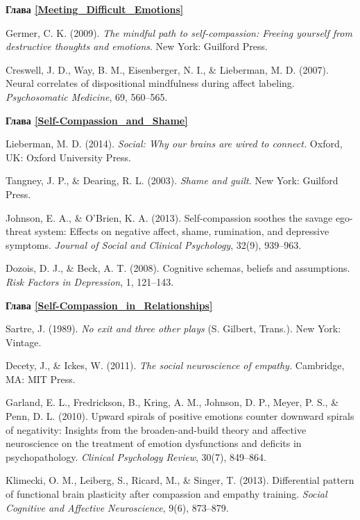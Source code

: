 \begin{thebibliography}{999}
	
	\vspace{3ex}
	\textbf{Глава \ref{Meeting_Difficult_Emotions}}
	
	 Germer, C. K. (2009). \textit{The mindful path to self-compassion: Freeing yourself from destructive thoughts and emotions}. New York: Guilford Press.
	
	 Creswell, J. D., Way, B. M., Eisenberger, N. I., \& Lieberman, M. D. (2007). Neural correlates of dispositional mindfulness during affect labeling. \textit{Psychosomatic Medicine}, 69, 560–565.
	
	
	\vspace{3ex}
	\textbf{Глава \ref{Self-Compassion_and_Shame}}
	
	 Lieberman, M. D. (2014). \textit{Social: Why our brains are wired to connect.} Oxford, UK: Oxford University Press.
	
	 Tangney, J. P., \& Dearing, R. L. (2003). \textit{Shame and guilt}. New York: Guilford Press.
	
	 Johnson, E. A., \& O’Brien, K. A. (2013). Self-compassion soothes the savage ego-threat system: Effects on negative affect, shame, rumination, and depressive symptoms. \textit{Journal of Social and Clinical Psychology}, 32(9), 939–963.
	
	 Dozois, D. J., \& Beck, A. T. (2008). Cognitive schemas, beliefs and assumptions. \textit{Risk Factors in Depression}, 1, 121–143.
	
	
	\vspace{3ex}
	\textbf{Глава \ref{Self-Compassion_in_Relationships}}
	
	 Sartre, J. (1989). \textit{No exit and three other plays} (S. Gilbert, Trans.). New York: Vintage.
	
	 Decety, J., \& Ickes, W. (2011). \textit{The social neuroscience of empathy.} Cambridge, MA: MIT Press.
	
	 Garland, E. L., Fredrickson, B., Kring, A. M., Johnson, D. P., Meyer, P. S., \& Penn, D. L. (2010). Upward spirals of positive emotions counter downward spirals of negativity: Insights from the broaden-and-build theory and affective neuroscience on the treatment of emotion dysfunctions and deficits in psychopathology. \textit{Clinical Psychology Review}, 30(7), 849–864.
	
	 Klimecki, O. M., Leiberg, S., Ricard, M., \& Singer, T. (2013). Differential pattern of functional brain plasticity after compassion and empathy training. \textit{Social Cognitive and Affective Neuroscience}, 9(6), 873–879.
	

\end{thebibliography}
